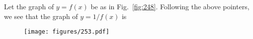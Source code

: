 \begin{example}[Graph of $y = 1/f(x)$]
    Let the graph of $y = f(x)$ be as in Fig.~\ref{fig:248}. Following the above pointers, we see that the graph of $y = 1/f(x)$ is
    \begin{figure}[H]
        \centering
        \hspace{7em}\texttt{[image: figures/253.pdf]}
        \caption{}
    \end{figure}
\end{example}